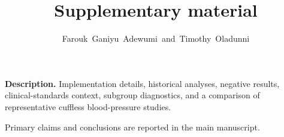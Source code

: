 \documentclass[journal]{IEEEtran}
\begin{document}
\title{Supplementary material}
\author{Farouk~Ganiyu~Adewumi~and~Timothy~Oladunni}
\maketitle
\noindent\textbf{Description.} Implementation details, historical analyses, negative results, clinical-standards context, subgroup diagnostics, and a comparison of representative cuffless blood-pressure studies.
\par\medskip
Primary claims and conclusions are reported in the main manuscript.
\appendices



\end{document}
